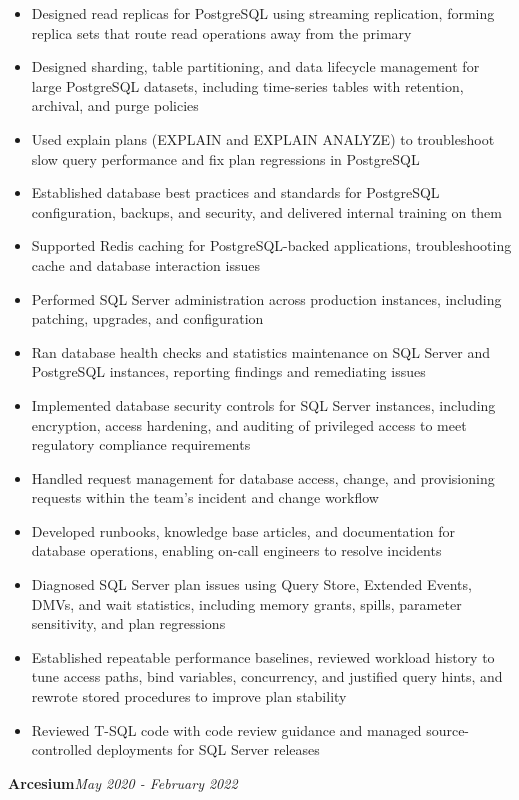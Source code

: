 \documentclass[10pt,a4paper]{article}
\begin{document}
\begin{itemize}
  \item Designed read replicas for PostgreSQL using streaming replication, forming replica sets that route read operations away from the primary
  \item Designed sharding, table partitioning, and data lifecycle management for large PostgreSQL datasets, including time-series tables with retention, archival, and purge policies
  \item Used explain plans (EXPLAIN and EXPLAIN ANALYZE) to troubleshoot slow query performance and fix plan regressions in PostgreSQL
  \item Established database best practices and standards for PostgreSQL configuration, backups, and security, and delivered internal training on them
  \item Supported Redis caching for PostgreSQL-backed applications, troubleshooting cache and database interaction issues
  \item Performed SQL Server administration across production instances, including patching, upgrades, and configuration
  \item Ran database health checks and statistics maintenance on SQL Server and PostgreSQL instances, reporting findings and remediating issues
  \item Implemented database security controls for SQL Server instances, including encryption, access hardening, and auditing of privileged access to meet regulatory compliance requirements
  \item Handled request management for database access, change, and provisioning requests within the team's incident and change workflow
  \item Developed runbooks, knowledge base articles, and documentation for database operations, enabling on-call engineers to resolve incidents
  \item Diagnosed SQL Server plan issues using Query Store, Extended Events, DMVs, and wait statistics, including memory grants, spills, parameter sensitivity, and plan regressions
  \item Established repeatable performance baselines, reviewed workload history to tune access paths, bind variables, concurrency, and justified query hints, and rewrote stored procedures to improve plan stability
  \item Reviewed T-SQL code with code review guidance and managed source-controlled deployments for SQL Server releases
\end{itemize}
\vspace{14.7pt}
\noindent\textbf{Arcesium}\hfill \textit{May 2020 - February 2022}
\end{document}
